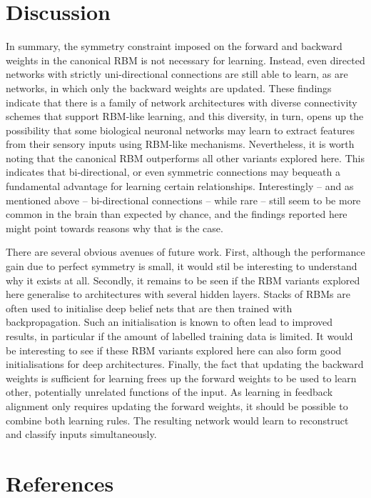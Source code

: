 \documentclass[11pt]{article}
\begin{document}
\section{Discussion}

In summary, the symmetry constraint imposed on the forward and
backward weights in the canonical RBM is not necessary for
learning. Instead, even directed networks with strictly
uni-directional connections are still able to learn, as are networks,
in which only the backward weights are updated. %
These findings indicate that there is a family of network
architectures with diverse connectivity schemes that support RBM-like
learning, and this diversity, in turn, opens up the possibility that
some biological neuronal networks may learn to extract features from
their sensory inputs using RBM-like mechanisms. %
Nevertheless, it is worth noting that the canonical RBM outperforms
all other variants explored here. This indicates that bi-directional,
or even symmetric connections may bequeath a fundamental advantage for
learning certain relationships. Interestingly -- and as mentioned
above -- bi-directional connections -- while rare -- still seem to be
more common in the brain than expected by chance, and the findings
reported here might point towards reasons why that is the case.

There are several obvious avenues of future work. %
First, although the performance gain due to perfect symmetry is small,
it would stil be interesting to understand why it exists at all. %
Secondly, it remains to be seen if the RBM variants explored here
generalise to architectures with several hidden layers. Stacks of RBMs
are often used to initialise deep belief nets that are then trained
with backpropagation. Such an initialisation is known to often lead to
improved results, in particular if the amount of labelled training
data is limited. It would be interesting to see if these RBM variants
explored here can also form good initialisations for deep
architectures. %
Finally, the fact that updating the backward weights is sufficient for
learning frees up the forward weights to be used to learn other,
potentially unrelated functions of the input. As learning in feedback
alignment only requires updating the forward weights, it should be
possible to combine both learning rules. The resulting network would
learn to reconstruct and classify inputs simultaneously.

\pagebreak

\section{References}


\end{document}
